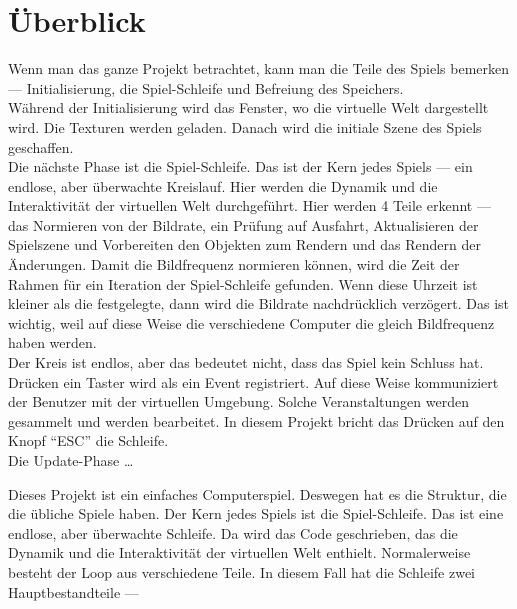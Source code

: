 \documentclass {article}
\begin{document}
\section{Überblick}
Wenn man das ganze Projekt betrachtet, kann man die Teile des Spiels bemerken --- Initialisierung, die Spiel-Schleife und Befreiung des Speichers.\\
Während der Initialisierung wird das Fenster, wo die virtuelle Welt dargestellt wird. Die Texturen werden geladen. Danach wird die initiale Szene des Spiels geschaffen.\\
Die nächste Phase ist die Spiel-Schleife. Das ist der Kern jedes Spiels --- ein endlose, aber überwachte Kreislauf. Hier werden die Dynamik und die Interaktivität der virtuellen Welt durchgeführt. Hier werden 4 Teile erkennt --- das Normieren von der Bildrate, ein Prüfung auf Ausfahrt, Aktualisieren der Spielszene und Vorbereiten den Objekten zum Rendern und
das Rendern der Änderungen. Damit die Bildfrequenz normieren können, wird die Zeit der Rahmen für ein Iteration der Spiel-Schleife gefunden. Wenn diese Uhrzeit ist kleiner als die festgelegte, dann wird die Bildrate nachdrücklich verzögert. Das ist wichtig, weil auf diese Weise die verschiedene Computer die gleich Bildfrequenz haben werden.\\
Der Kreis ist endlos, aber das bedeutet nicht, dass das Spiel kein Schluss hat. Drücken ein Taster wird als ein Event registriert. Auf diese Weise kommuniziert der Benutzer mit der virtuellen Umgebung. Solche Veranstaltungen werden gesammelt und werden bearbeitet. In diesem Projekt bricht das Drücken auf den Knopf ``ESC'' die Schleife.\\
Die Update-Phase \ldots


Dieses Projekt ist ein einfaches Computerspiel. Deswegen hat es die Struktur, die die übliche Spiele haben.
Der Kern jedes Spiels ist die Spiel-Schleife. Das ist eine endlose, aber überwachte Schleife. Da wird das Code geschrieben, das die Dynamik und die Interaktivität der virtuellen Welt enthielt. Normalerweise besteht der Loop aus verschiedene Teile. In diesem Fall hat die Schleife zwei Hauptbestandteile ---
\end{document}
